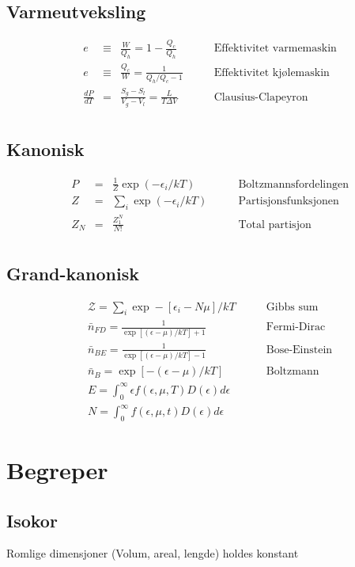 \documentclass{article}
\begin{document}
\begin{multicols}{2}
\subsection*{Varmeutveksling}
$$\begin{aligned}
&e&\equiv&\frac{W}{Q_h}=1-\frac{Q_c}{Q_h}\qquad&\text{Effektivitet varmemaskin}\\
&e&\equiv&\frac{Q_c}{W}=\frac{1}{Q_h/Q_c-1}\qquad&\text{Effektivitet kj{\o}lemaskin}\\
&\frac{dP}{dT}&=&\frac{S_g-S_l}{V_g-V_l}=\frac{L}{T\Delta V}\qquad&\text{Clausius-Clapeyron}\\
\end{aligned}$$
\subsection*{Kanonisk}
$$\begin{aligned}
&P&=&\frac{1}{Z}\exp(-\epsilon_i/kT)\qquad&\text{Boltzmannsfordelingen}\\
&Z&=&\sum_i\exp(-\epsilon_i/kT)\qquad&\text{Partisjonsfunksjonen}\\
&Z_N&=&\frac{Z_1^N}{N!}\qquad&\text{Total partisjon}\\
\end{aligned}$$
\subsection*{Grand-kanonisk}
$$\begin{aligned}
&\mathcal{Z}=\sum_i \exp-[\epsilon_i-N\mu]/kT\qquad&\text{Gibbs sum}\\
&\bar{n}_{FD}=\frac{1}{\exp[(\epsilon-\mu)/kT]+1}\qquad&\text{Fermi-Dirac}\\
&\bar{n}_{BE}=\frac{1}{\exp[(\epsilon-\mu)/kT]-1}\qquad&\text{Bose-Einstein}\\
&\bar{n}_{B}=\exp[-(\epsilon-\mu)/kT]\qquad&\text{Boltzmann}\\
&E=\int_0^{\infty}\epsilon f(\epsilon,\mu,T)D(\epsilon)d\epsilon\\
&N=\int_0^{\infty}f(\epsilon,\mu,t)D(\epsilon)d\epsilon
\end{aligned}$$


\section*{Begreper}
\subsection*{Isokor}
Romlige dimensjoner (Volum, areal, lengde) holdes konstant

\end{multicols}
\end{document}
